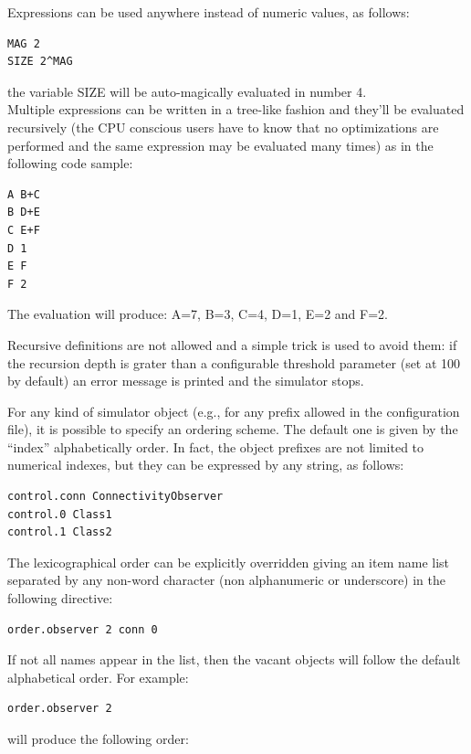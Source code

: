 \documentclass[a4paper,11pt]{article}
\begin{document}
Expressions can be used anywhere instead of numeric values, as follows:

\begin{verbatim}
MAG 2
SIZE 2^MAG
\end{verbatim}

the variable SIZE will be auto-magically evaluated in number 4.\\
Multiple expressions can be written in a tree-like fashion and they'll
be evaluated recursively (the CPU conscious users have to know that 
no optimizations are performed and the same expression may be evaluated
many times) as in the following code sample:

\begin{verbatim}
A B+C
B D+E
C E+F
D 1
E F
F 2
\end{verbatim}

The evaluation will produce: A=7, B=3, C=4, D=1, E=2 and F=2.

Recursive definitions are not allowed and a simple trick is used to 
avoid them: if the recursion depth is grater than a configurable 
threshold parameter (set at 100 by default) an error message is
printed and the simulator stops.

For any kind of simulator object (e.g., for any prefix allowed in the
configuration file),
it is possible to specify an ordering scheme. The default one is given
by the ``index''
alphabetically order. 
In fact, the object prefixes are
not limited to numerical indexes, but they can be expressed by any 
string, as follows:

\begin{verbatim}
control.conn ConnectivityObserver
control.0 Class1
control.1 Class2
\end{verbatim}

The lexicographical order can be explicitly overridden 
giving an item name list separated  by any non-word character
(non alphanumeric or underscore) in the following directive:

\begin{verbatim}
order.observer 2 conn 0
\end{verbatim}

If not all names appear in the list,
then the vacant objects will follow the default alphabetical order.
For example:

\begin{verbatim}
order.observer 2
\end{verbatim}

will produce the following order:
\end{document}
